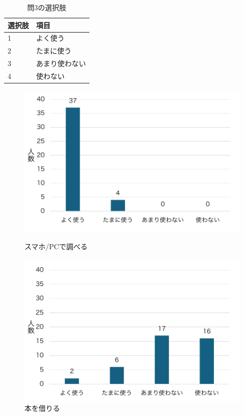 \documentclass[12pt,a4j,titlepage]{ltjsarticle}
\begin{document}
\begin{table}[htbp]
  \caption{問3の選択肢}
  \begin{center}
\begin{tabular}{ll}\hline
選択肢 & 項目\\ \hline
               1 & よく使う \\ 
               2 & たまに使う\\
               3 & あまり使わない\\
               4 & 使わない\\
              \hline
               \end{tabular}
               \end{center}
               \label{tb:anke1_3}
               \end{table}

\clearpage

\begin{figure}[!htb]
\centering
\begin{minipage}[b]{0.49\columnwidth}
    \centering
    \includegraphics[width=1.0\columnwidth]{スマホPCで調べる.pdf}
    \caption{スマホ/PCで調べる}
    \label{fig:pc}
\end{minipage}
\begin{minipage}[b]{0.49\columnwidth}
    \centering
    \includegraphics[width=1.0\columnwidth]{本を借りる.pdf}
    \caption{本を借りる}
    \label{fig:hon}
\end{minipage}
\end{figure}
\end{document}

